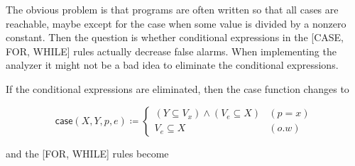 \documentclass{article}
\begin{document}
The obvious problem is that programs are often written so that all cases are reachable, maybe except for the case when some value is divided by a nonzero constant. Then the question is whether conditional expressions in the [CASE, FOR, WHILE] rules actually decrease false alarms. When implementing the analyzer it might not be a bad idea to eliminate the conditional expressions.

If the conditional expressions are eliminated, then the case function changes to

\[
\mathsf{case}(X,Y,p,e)\coloneq
\begin{cases}
  (Y\subseteq V_{x})\wedge (V_{e}\subseteq X) & (p=x)\\
  V_{e} \subseteq X & (o.w)
\end{cases}
\]

and the [FOR, WHILE] rules become

\begin{center}
\begin{prooftree}
\end{prooftree}
\vspace{0.2cm}

\begin{prooftree}
\end{prooftree}
\end{center}
\printbibliography
\end{document}
